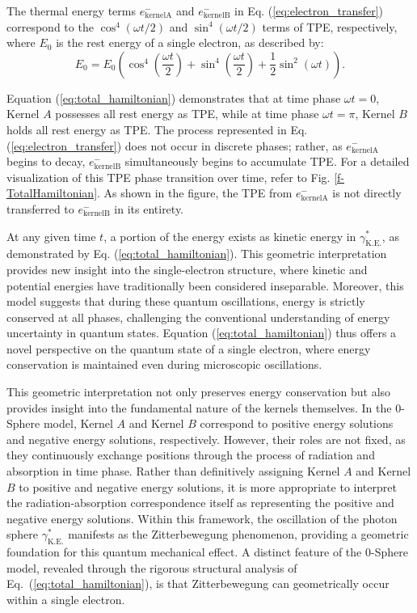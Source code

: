 \documentclass[%
 reprint,
 amsmath,amssymb,
 aps,
]{revtex4-1}
\numberwithin{equation}{section}%
\begin{document}
The thermal energy terms $e^-_{\mathrm{kernelA}}$ and $e^-_{\mathrm{kernelB}}$ in Eq. (\ref{eq:electron_transfer}) correspond to the $\cos^4(\omega t/2)$ and $\sin^4(\omega t/2)$ terms of TPE, respectively, where $E_0$ is the rest energy of a single electron, as described by:
\begin{equation}
E_{0} = E_{0} \left( \cos^{4} \left( \frac{\omega t}{2} \right) + \sin^{4} \left( \frac{\omega t}{2} \right) + \frac{1}{2} \sin^{2} (\omega t) \right).
\label{eq:total_hamiltonian}
\end{equation}

Equation (\ref{eq:total_hamiltonian}) demonstrates that at time phase $\omega t=0$, Kernel $A$ possesses all rest energy as TPE, while at time phase $\omega t=\pi$, Kernel $B$ holds all rest energy as TPE. The process represented in Eq. (\ref{eq:electron_transfer}) does not occur in discrete phases; rather, as $e^-_{\mathrm{kernelA}}$ begins to decay, $e^-_{\mathrm{kernelB}}$ simultaneously begins to accumulate TPE. For a detailed visualization of this TPE phase transition over time, refer to Fig. \ref{f-TotalHamiltonian}. As shown in the figure, the TPE from $e^-_{\mathrm{kernelA}}$ is not directly transferred to $e^-_{\mathrm{kernelB}}$ in its entirety.

At any given time $t$, a portion of the energy exists as kinetic energy in $\gamma^*_{\mathrm{K.E.}}$, as demonstrated by Eq. (\ref{eq:total_hamiltonian}). This geometric interpretation provides new insight into the single-electron structure, where kinetic and potential energies have traditionally been considered inseparable. Moreover, this model suggests that during these quantum oscillations, energy is strictly conserved at all phases, challenging the conventional understanding of energy uncertainty in quantum states. Equation (\ref{eq:total_hamiltonian}) thus offers a novel perspective on the quantum state of a single electron, where energy conservation is maintained even during microscopic oscillations.

This geometric interpretation not only preserves energy conservation but also provides insight into the fundamental nature of the kernels themselves. In the 0-Sphere model, Kernel $A$ and Kernel $B$ correspond to positive energy solutions and negative energy solutions, respectively. However, their roles are not fixed, as they continuously exchange positions through the process of radiation and absorption in time phase. Rather than definitively assigning Kernel $A$ and Kernel $B$ to positive and negative energy solutions, it is more appropriate to interpret the radiation-absorption correspondence itself as representing the positive and negative energy solutions. Within this framework, the oscillation of the photon sphere $\gamma^*_{\mathrm{K.E.}}$ manifests as the Zitterbewegung phenomenon, providing a geometric foundation for this quantum mechanical effect. A distinct feature of the 0-Sphere model, revealed through the rigorous structural analysis of Eq.~(\ref{eq:total_hamiltonian}), is that Zitterbewegung can geometrically occur within a single electron.
\end{document}
